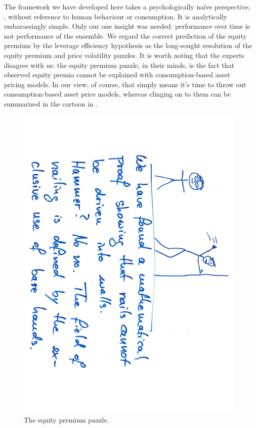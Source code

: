 The framework we have developed here takes a psychologically na\"{i}ve perspective, , without reference to human behaviour or consumption.
It is analytically embarassingly simple. Only our one insight was needed: performance over time is not performance of the ensemble. 
We regard the correct prediction of the equity premium by the leverage efficiency hypothesis as the long-sought resolution of the equity premium and price volatility puzzles. It is worth noting that the experts disagree with us: the equity premium puzzle, in their minds, is the fact that observed equity premia cannot be explained with consumption-based asset pricing models. In our view, of course, that simply means it's time to throw out consumption-based asset price models, whereas clinging on to them can be summarized in the cartoon in .
\begin{figure}
\centering
\includegraphics[width=.8\textwidth,angle=90]{./chapter_4/figs/cartoon.pdf}
\caption{The equity premium puzzle.}
\end{figure}


